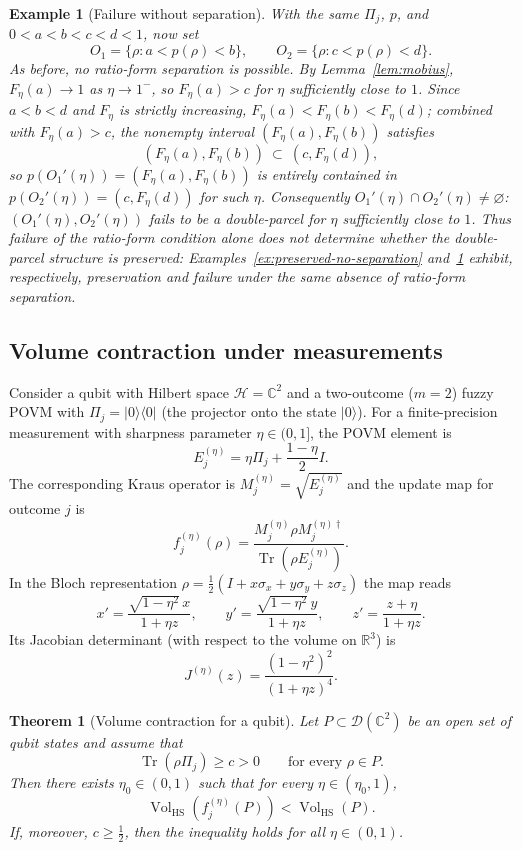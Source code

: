 \documentclass[11pt, onecolumn]{article}
\newtheorem{theorem}{Theorem}
\newtheorem{example}{Example}
\begin{document}
\begin{example}[Failure without separation]
\label{ex:failure-no-separation}
With the same $\Pi_j$, $p$, and $0<a<b<c<d<1$, now set
\[
O_1=\{\rho: a<p(\rho)<b\},\qquad O_2=\{\rho: c<p(\rho)<d\}.
\]
As before, no ratio-form separation is possible. By Lemma~\ref{lem:mobius}, $F_\eta(a)\to1$ as $\eta\to1^-$, so $F_\eta(a)>c$ for $\eta$ sufficiently close to $1$. Since $a<b<d$ and $F_\eta$ is strictly increasing, $F_\eta(a)<F_\eta(b)<F_\eta(d)$; combined with $F_\eta(a)>c$, the nonempty interval $(F_\eta(a),F_\eta(b))$ satisfies
\[
(F_\eta(a),F_\eta(b))\ \subset\ (c,F_\eta(d)),
\]
so $p(O_1'(\eta))=(F_\eta(a),F_\eta(b))$ is entirely contained in $p(O_2'(\eta))=(c,F_\eta(d))$ for such $\eta$. Consequently $O_1'(\eta)\cap O_2'(\eta)\neq\varnothing$: $(O_1'(\eta),O_2'(\eta))$ fails to be a double-parcel for $\eta$ sufficiently close to $1$. Thus failure of the ratio-form condition alone does not determine whether the double-parcel structure is preserved: Examples~\ref{ex:preserved-no-separation} and~\ref{ex:failure-no-separation} exhibit, respectively, preservation and failure under the same absence of ratio-form separation.
\end{example}

\subsection{Volume contraction under measurements}

Consider a qubit with Hilbert space \(\mathcal{H}=\mathbb{C}^2\) and a two-outcome ($m=2$) fuzzy POVM with $\Pi_j=|0\rangle\langle0|$ (the projector onto the state \(|0\rangle\)). For a finite-precision measurement with sharpness parameter \(\eta\in(0,1]\), the POVM element is
\[
E_j^{(\eta)} = \eta\Pi_j + \frac{1-\eta}{2}I.
\]
The corresponding Kraus operator is \(M_j^{(\eta)}=\sqrt{E_j^{(\eta)}}\) and the update map for outcome \(j\) is
\[
f_j^{(\eta)}(\rho) = \frac{M_j^{(\eta)}\rho M_j^{(\eta)\dagger}}{\operatorname{Tr}(\rho E_j^{(\eta)})}.
\]
In the Bloch representation \(\rho=\frac12(I+x\sigma_x+y\sigma_y+z\sigma_z)\) the map reads
\[
x' = \frac{\sqrt{1-\eta^2}\,x}{1+\eta z},\qquad
y' = \frac{\sqrt{1-\eta^2}\,y}{1+\eta z},\qquad
z' = \frac{z+\eta}{1+\eta z}.
\]
Its Jacobian determinant (with respect to the volume on \(\mathbb{R}^3\)) is
\begin{equation}\label{jacob}
J^{(\eta)}(z) = \frac{(1-\eta^2)^2}{(1+\eta z)^4}.
\end{equation}

\begin{theorem}[Volume contraction for a qubit]
\label{thm:volcontraction_qubit}
Let \(P\subset\mathcal{D}(\mathbb{C}^2)\) be an open set of qubit states and assume that
\[
\operatorname{Tr}(\rho\Pi_j)\ge c>0 \qquad\text{for every }\rho\in P.
\]
Then there exists \(\eta_0\in(0,1)\) such that for every \(\eta\in(\eta_0,1)\),
\[
\operatorname{Vol}_{\mathrm{HS}}(f_j^{(\eta)}(P))<\operatorname{Vol}_{\mathrm{HS}}(P).
\]
If, moreover, \(c\ge\frac12\), then the inequality holds for all \(\eta\in(0,1)\).
\end{theorem}
\end{document}
